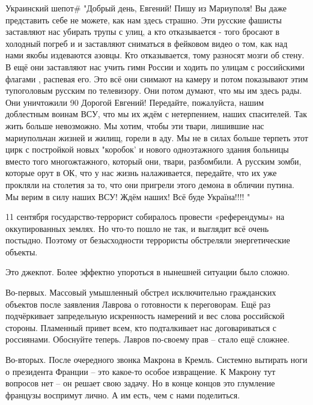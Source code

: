Украинский шепот# "Добрый день, Евгений! Пишу из Мариуполя! Вы даже представить себе не можете, как нам здесь страшно. Эти русские фашисты заставляют нас убирать трупы с улиц, а кто отказывается - того бросают в холодный погреб и и заставляют сниматься в фейковом видео о том, как над нами якобы издеваются азовцы. Кто отказывается, тому разносят мозги об стену. В ещё они заставляют нас учить гимн России и ходить по улицам с российскими флагами , распевая его. Это всё они снимают на камеру и потом показывают этим тупоголовым русским по телевизору. Они потом думают, что мы им здесь рады. Они уничтожили 90%
Дорогой Евгений! Передайте, пожалуйста, нашим доблестным воинам ВСУ, что мы их ждём с нетерпением, наших спасителей. Так жить больше невозможно. Мы хотим, чтобы эти твари, лишившие нас мариупольчан жизней и жилищ, горели в аду. Мы не в силах больше терпеть этот цирк с постройкой новых "коробок' и нового одноэтажного здания больницы вместо того многожтажного, который они, твари, разбомбили. А русским зомби, которые орут в ОК, что у нас жизнь налаживается, передайте, что их уже прокляли на столетия за то, что они пригрели этого демона в обличии путина. Мы верим в силу наших ВСУ! Ждём наших! Всё буде Україна!!!! "


11 сентября государство-террорист собиралось провести «референдумы» на оккупированных землях. Но что-то пошло не так, и выглядит всё очень постыдно. Поэтому от безысходности террористы обстреляли энергетические объекты. 
 
Это джекпот. Более эффектно упороться в нынешней ситуации было сложно.
 
Во-первых. Массовый умышленный обстрел исключительно гражданских объектов после заявления Лаврова о готовности к переговорам. Ещё раз подчёркивает запредельную искренность намерений и вес слова российской стороны. Пламенный привет всем, кто подталкивает нас договариваться с россиянами. Обоснуйте теперь. Лавров по-своему прав – стало ещё сложнее. 
 
Во-вторых. После очередного звонка Макрона в Кремль. Системно вытирать ноги о президента Франции – это какое-то особое извращение. К Макрону тут вопросов нет – он решает свою задачу. Но в конце концов это глумление французы воспримут лично. А им есть, чем с нами поделиться. 
 
